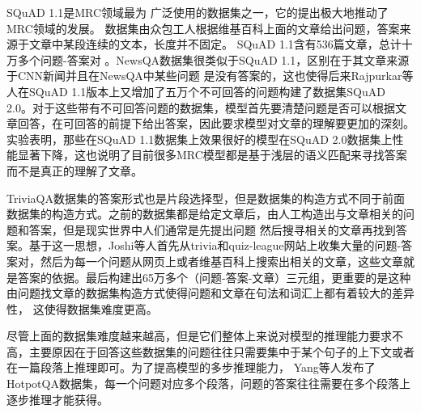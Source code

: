 SQuAD 1.1是MRC领域最为
广泛使用的数据集之一，它的提出极大地推动了MRC领域的发展。
数据集由众包工人根据维基百科上面的文章给出问题，答案来源于文章中某段连续的文本，长度并不固定。
SQuAD 1.1含有536篇文章，总计十万多个问题-答案对
。NewsQA数据集很类似于SQuAD 1.1，区别在于其文章来源于CNN新闻并且在NewsQA中某些问题
是没有答案的，这也使得后来Rajpurkar等人在SQuAD 1.1版本上又增加了五万个不可回答的问题构建了数据集SQuAD 2.0。对于这些带有不可回答问题的数据集，模型首先要清楚问题是否可以根据文章回答，在可回答的前提下给出答案，因此要求模型对文章的理解要更加的深刻。
实验表明，那些在SQuAD 1.1数据集上效果很好的模型在SQuAD 2.0数据集上性能显著下降，这也说明了目前很多MRC模型都是基于浅层的语义匹配来寻找答案而不是真正的理解了文章。

TriviaQA数据集的答案形式也是片段选择型，但是数据集的构造方式不同于前面数据集的构造方式。之前的数据集都是给定文章后，由人工构造出与文章相关的问题和答案，但是现实世界中人们通常是先提出问题
然后搜寻相关的文章再找到答案。基于这一思想，Joshi等人首先从trivia和quiz-league网站上收集大量的问题-答案对，然后为每一个问题从网页上或者维基百科上搜索出相关的文章，这些文章就是答案的依据。最后构建出65万多个（问题-答案-文章）三元组，更重要的是这种由问题找文章的数据集构造方式使得问题和文章在句法和词汇上都有着较大的差异性，
这使得数据集难度更高。

尽管上面的数据集难度越来越高，但是它们整体上来说对模型的推理能力要求不高，主要原因在于回答这些数据集的问题往往只需要集中于某个句子的上下文或者在一篇段落上推理即可。为了提高模型的多步推理能力，
Yang等人发布了HotpotQA数据集，每一个问题对应多个段落，问题的答案往往需要在多个段落上逐步推理才能获得。


